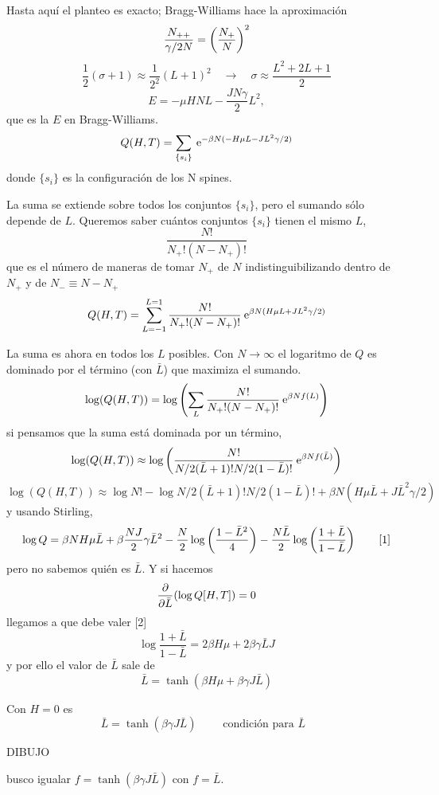 \documentclass[10pt,oneside]{CBFT_book}
\begin{document}
Hasta aquí el planteo es exacto; Bragg-Williams hace la aproximación
\[
	\frac{N_{++}}{\gamma/2 N}= \left( \frac{ N_+ }{ N } \right)^2
\]
\[
	\frac{1}{2}(\sigma + 1) \approx \frac{1}{2^2} (L+1)^2 \quad \rightarrow \quad 
	\sigma \approx \frac{L^2 + 2L + 1}{2}
\]
\[ 
	\boxed{ E = -\mu H N L - \frac{JN\gamma }{2}L^2 },
\]
que es la $E$ en Bragg-Williams.
\[
	Q(H,T) = \sum_{\{ s_i\}} \:\mathrm{e}^{-\beta N(- H\mu L - JL^2 \gamma / 2) }
\]
donde $\{ s_i\}$ es la configuración de los N spines.

La suma se extiende sobre todos los conjuntos $\{ s_i\}$, pero el sumando sólo depende de $L$.
Queremos saber cuántos conjuntos $\{ s_i\}$ tienen el mismo $L$,
\[
	\frac{N!}{N_+!(N-N_+)!}
\]
que es el número de maneras de tomar $N_+$ de $N$ indistinguibilizando dentro de $N_+$ y de $N_-\equiv
N-N_+$
\[
	Q(H,T) = \sum_{L=-1}^{L=1} \frac{N!}{N_+!(N-N_+)!}
	\:\mathrm{e}^{\beta N( H\mu L + JL^2 \gamma / 2) }
\]

La suma es ahora en todos los $L$ posibles. Con $N\to\infty$ el logaritmo de $Q$ es dominado por el término
(con $\bar{L}$) que maximiza el sumando.
\[
	\log (Q(H,T)) = \log \left( \sum_L \frac{N!}{N_+!(N-N_+)!} \:\mathrm{e}^{\beta N f(L)} \right)
\]
si pensamos que la suma está dominada por un término,
\[
	\log (Q(H,T)) \approx \log \left( \frac{N!}{ N/2(\bar{L}+1)!N/2(1-\bar{L})!} 
	\:\mathrm{e}^{\beta N f(\bar{L})} \right)
\]
\[
	\log (Q(H,T)) \approx \log N! - \log N/2(\bar{L}+1)!N/2(1-\bar{L})! + 
	\beta N ( H\mu \bar{L} + J\bar{L}^2 \gamma/2 ) 
\]
y usando Stirling,
\[
	\log Q = \beta N H \mu \bar{L} + \beta \frac{NJ}{2} \gamma \bar{L}^2 -
	\frac{N}{2} \log \left( \frac{ 1-\bar{L}^2 }{ 4 } \right) - \frac{N\bar{L}}{2} \log \left( \frac{ 1+\bar{L} }{ 1-\bar{L} } \right)
	\qquad [1]
\]
pero no sabemos quién es $\bar{L}$. Y si hacemos
\[
	\frac{\partial^{\hspace{-0.05em}} {}}{\partial {\bar{L}}^{\hspace{-0.05em}}}( \log Q[H,T] ) = 0
\]
llegamos a que debe valer [2]
\[
	\log \frac{1+\bar{L}}{1-\bar{L}} = 2\beta H\mu + 2\beta \gamma \bar{L} J
\]
y por ello el valor de $\bar{L}$ sale de
\[
	\bar{L} = \tanh( \beta H \mu + \beta \gamma J \bar{L} )
\]

Con $H=0$ es 
\[
	\boxed{ \bar{L} = \tanh( \beta \gamma J \bar{L} ) } \qquad \text{ condición para $\bar{L}$ }
\]

DIBUJO 

busco igualar $f=\tanh(\beta\gamma J\bar{L})$ con $f=\bar{L}$.
\end{document}
